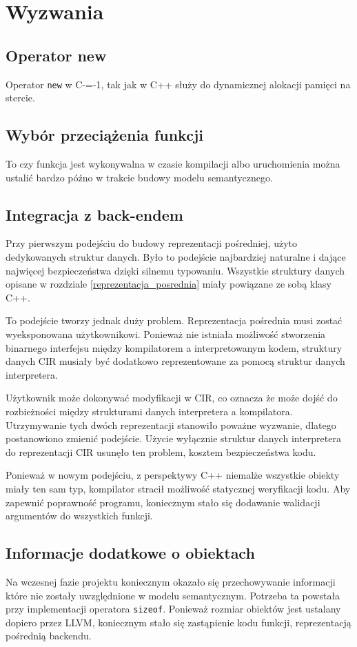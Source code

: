 \section{Wyzwania}


\subsection{Operator new}

Operator \texttt{new} w C-=-1, tak jak w C++ służy do dynamicznej alokacji pamięci na stercie.


\subsection{Wybór przeciążenia funkcji}
To czy funkcja jest wykonywalna w czasie kompilacji albo uruchomienia można ustalić bardzo późno w trakcie budowy modelu semantycznego.
\subsection{Integracja z back-endem}
Przy pierwszym podejściu do budowy reprezentacji pośredniej, użyto dedykowanych struktur danych. Było to podejście najbardziej naturalne i dające najwięcej bezpieczeństwa dzięki silnemu typowaniu. Wszystkie struktury danych opisane w rozdziale \ref{reprezentacja_posrednia} miały powiązane ze sobą klasy C++.


To podejście tworzy jednak duży problem. Reprezentacja pośrednia musi zostać wyeksponowana użytkownikowi. Ponieważ nie istniała możliwość stworzenia binarnego interfejsu między kompilatorem a interpretowanym kodem, struktury danych CIR musiały być dodatkowo reprezentowane za pomocą struktur danych interpretera.


Użytkownik może dokonywać modyfikacji w CIR, co oznacza że może dojść do rozbieżności między strukturami danych interpretera a kompilatora. Utrzymywanie tych dwóch reprezentacji stanowiło poważne wyzwanie, dlatego postanowiono zmienić podejście. Użycie wyłącznie struktur danych interpretera do reprezentacji CIR usunęło ten problem, kosztem bezpieczeństwa kodu.


Ponieważ w nowym podejściu, z perspektywy C++ niemalże wszystkie obiekty miały ten sam typ, kompilator stracił możliwość statycznej weryfikacji kodu.
Aby zapewnić poprawność programu, koniecznym stało się dodawanie walidacji argumentów do wszystkich funkcji.

\subsection{Informacje dodatkowe o obiektach}
Na wczesnej fazie projektu koniecznym okazało się przechowywanie informacji które nie zostały uwzględnione w modelu semantycznym.
Potrzeba ta powstała przy implementacji operatora \texttt{sizeof}.
Ponieważ rozmiar obiektów jest ustalany dopiero przez LLVM, koniecznym stało się zastąpienie kodu funkcji, reprezentacją pośrednią backendu.

